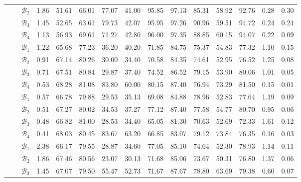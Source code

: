 \begin{table}[h!]
{\begin{tabular}{c|l|c|c|cccc|ccc|cc|cc}
 & & $\mathcal{B}_2$ & 1.86 & 51.61 & 66.01 & 77.07 & 41.00 & 95.85 & 97.13 & 85.31 & 58.92 & 92.76 & 0.28 & 0.30 \\
 & & $\mathcal{B}_3$ & 1.45 & 52.65 & 63.61 & 79.73 & 42.07 & 95.95 & 97.26 & 90.96 & 59.51 & 94.72 & 0.24 & 0.24 \\
 & & $\mathcal{B}_4$ & 1.13 & 56.93 & 69.61 & 71.27 & 42.80 & 96.00 & 97.35 & 88.85 & 60.15 & 94.07 & 0.22 & 0.09 \\ \midrule
 &  
 & $\mathcal{B}_1$ & 1.22 & 65.68 & 77.23 & 36.20 & 40.20 & 71.85 & 84.75 & 75.37 & 54.83 & 77.32 & 1.10 & 0.15 \\
 & & $\mathcal{B}_2$ & 0.91 & 67.14 & 80.26 & 30.00 & 34.40 & 70.58 & 84.35 & 74.61 & 52.95 & 76.52 & 1.25 & 0.08 \\
 & & $\mathcal{B}_3$ & 0.71 & 67.51 & 80.84 & 29.87 & 37.40 & 74.52 & 86.52 & 79.15 & 53.90 & 80.06 & 1.01 & 0.05 \\
 & & $\mathcal{B}_4$ & 0.53 & 68.28 & 81.08 & 83.80 & 60.00 & 80.15 & 87.40 & 76.94 & 73.29 & 81.50 & 0.15 & 0.01 \\ 
 &  
 & $\mathcal{B}_1$ & 0.57 & 66.78 & 79.88 & 29.53 & 35.13 & 69.08 & 84.88 & 78.96 & 52.83 & 77.64 & 1.19 & 0.09 \\
 & & $\mathcal{B}_2$ & 0.51 & 67.27 & 80.02 & 34.53 & 37.27 & 77.12 & 87.40 & 77.58 & 54.77 & 80.70 & 0.95 & 0.06 \\
 & & $\mathcal{B}_3$ & 0.48 & 66.82 & 81.00 & 28.53 & 34.40 & 65.05 & 81.30 & 70.63 & 52.69 & 72.33 & 1.61 & 0.12 \\
 & & $\mathcal{B}_4$ & 0.41 & 68.03 & 80.45 & 83.67 & 63.20 & 66.85 & 83.07 & 79.12 & 73.84 & 76.35 & 0.16 & 0.03 \\ 
 &  
 & $\mathcal{B}_1$ & 2.38 & 66.17 & 79.55 & 28.87 & 34.60 & 77.05 & 85.10 & 74.64 & 52.30 & 78.93 & 1.14 & 0.11 \\
 & & $\mathcal{B}_2$ & 1.86 & 67.46 & 80.56 & 23.07 & 30.13 & 71.68 & 85.06 & 73.67 & 50.31 & 76.80 & 1.37 & 0.06 \\
 & & $\mathcal{B}_3$ & 1.45 & 67.07 & 79.50 & 55.47 & 52.73 & 71.67 & 87.67 & 78.80 & 63.69 & 79.38 & 0.60 & 0.07 \\

\end{tabular}}
\end{table}
